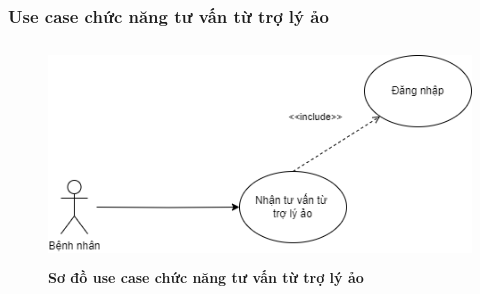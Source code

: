 \subsubsection{Use case chức năng tư vấn từ trợ lý ảo}
  \begin{figure}[H]
    \centering
    \includegraphics[width=12.5cm,height=5.8cm]{Images/use_case/use_case_chatbot.png}
    \caption[Sơ đồ use case chức năng tư vấn từ trợ lý ảo]{\bfseries \fontsize{12pt}{0pt}
    \selectfont Sơ đồ use case chức năng tư vấn từ trợ lý ảo}
    \label{use_case_chat_with_bot} %
  \end{figure}

